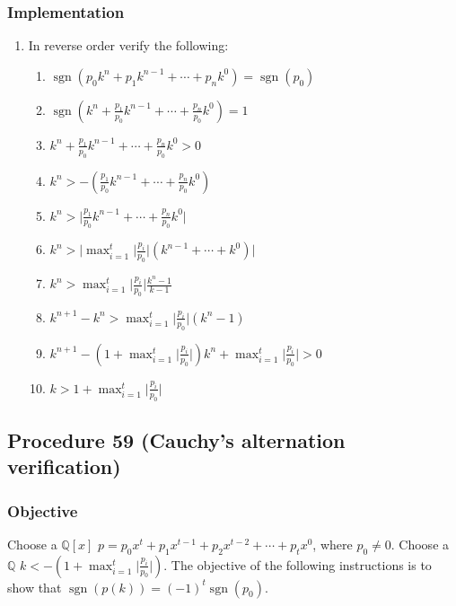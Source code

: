 \documentclass[twocolumn]{article}
\DeclareMathOperator{\sgn}{sgn}
\begin{document}
			\subsubsection{Implementation}
				\begin{enumerate}
					\item In reverse order verify the following:
					\begin{enumerate}
						\item \textbf{$\sgn(p_0k^n+p_1k^{n-1}+\cdots+p_nk^0)=\sgn(p_0)$}
						\item $\sgn(k^n+\frac{p_1}{p_0}k^{n-1}+\cdots+\frac{p_n}{p_0}k^0)=1$
						\item $k^n+\frac{p_1}{p_0}k^{n-1}+\cdots+\frac{p_n}{p_0}k^0>0$
						\item $k^n>-(\frac{p_1}{p_0}k^{n-1}+\cdots+\frac{p_n}{p_0}k^0)$
						\item $k^n>\lvert \frac{p_1}{p_0}k^{n-1}+\cdots+\frac{p_n}{p_0}k^0\rvert$
						\item $k^n>\lvert\max_{i=1}^t\lvert \frac{p_i}{p_0}\rvert(k^{n-1}+\cdots+k^0)\rvert$
						\item $k^n>\max_{i=1}^t\lvert \frac{p_i}{p_0}\rvert\frac{k^n-1}{k-1}$
						\item $k^{n+1}-k^n>\max_{i=1}^t\lvert \frac{p_i}{p_0}\rvert(k^n-1)$
						\item $k^{n+1}-(1+\max_{i=1}^t\lvert \frac{p_i}{p_0}\rvert)k^n+\max_{i=1}^t\lvert \frac{p_i}{p_0}\rvert>0$
						\item $k>1+\max_{i=1}^t\lvert \frac{p_i}{p_0}\rvert$
					\end{enumerate}
				\end{enumerate}
		\subsection{Procedure 59 (Cauchy's alternation verification)}\label{sec:procedure 59}
			\subsubsection{Objective}
				Choose a $\mathbb{Q}[x]$ $p=p_0x^t+p_1x^{t-1}+p_2x^{t-2}+\cdots+p_tx^0$, where $p_0\ne 0$. Choose a $\mathbb{Q}$ $k<-(1+\max_{i=1}^t\lvert\frac{p_i}{p_0}\rvert)$. The objective of the following instructions is to show that $\sgn(p(k))=(-1)^t\sgn(p_0)$.
\end{document}
